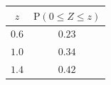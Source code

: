 {\setlength{\tabcolsep}{5pt}\renewcommand{\arraystretch}{1.25}%
\begin{tabular}{|c|c|}
\hline
$z$ & $\mathrm{P}(0\le Z\le z)$ \\
\hline
$0.6$ & $0.23$ \\
\hline
$1.0$ & $0.34$ \\
\hline
$1.4$ & $0.42$ \\
\hline
\end{tabular}}
